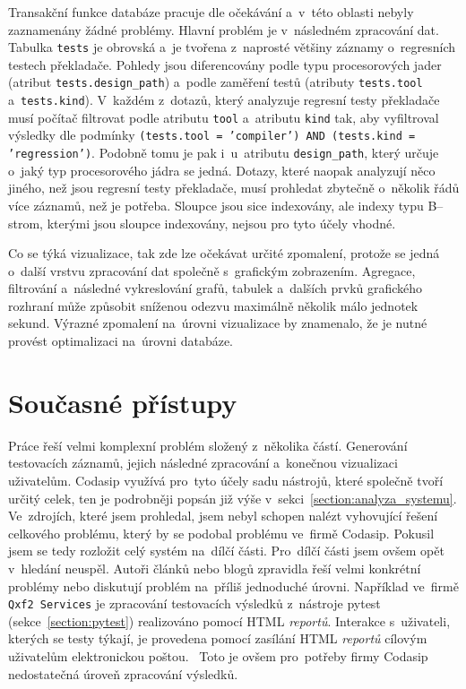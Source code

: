 Transakční funkce databáze pracuje dle očekávání a~v~této oblasti nebyly zaznamenány žádné problémy. Hlavní problém
je v~následném zpracování dat. Tabulka \texttt{tests} je obrovská a~je tvořena z~naprosté většiny záznamy
o~regresních testech překladače. Pohledy jsou diferencovány podle typu procesorových jader (atribut
\texttt{tests.design\_path}) a~podle zaměření testů (atributy \texttt{tests.tool} a~\texttt{tests.kind}). V~každém
z~dotazů, který analyzuje regresní testy překladače musí počítač filtrovat podle atributu \texttt{tool} a~atributu
\texttt{kind} tak, aby vyfiltroval výsledky dle podmínky \texttt{(tests.tool = 'compiler') AND (tests.kind = 'regression')}. Podobně tomu je pak i~u~atributu \texttt{design\_path}, který určuje o~jaký typ procesorového jádra
se jedná. Dotazy, které naopak analyzují něco jiného, než jsou regresní testy překladače, musí prohledat zbytečně
o~několik řádů více záznamů, než je potřeba. Sloupce jsou sice indexovány, ale indexy typu B--strom, kterými jsou sloupce indexovány, nejsou pro tyto účely vhodné.

Co se týká vizualizace, tak zde lze očekávat určité zpomalení, protože se jedná o~další vrstvu zpracování dat
společně s~grafickým zobrazením. Agregace, filtrování a~následné vykreslování grafů, tabulek a~dalších prvků
grafického rozhraní může způsobit sníženou odezvu maximálně několik málo jednotek sekund. Výrazné zpomalení na~úrovni
vizualizace by znamenalo, že je nutné provést optimalizaci na~úrovni databáze.

\section{Současné přístupy}
\label{section:soucasne_pristupy}
Práce řeší velmi komplexní problém složený z~několika částí. Generování testovacích záznamů, jejich následné
zpracování a~konečnou vizualizaci uživatelům. Codasip využívá pro~tyto účely sadu nástrojů, které společně tvoří
určitý celek, ten je podrobněji popsán již výše v~sekci~\ref{section:analyza_systemu}.
Ve~zdrojích, které jsem prohledal, jsem nebyl schopen nalézt vyhovující řešení celkového problému, který by se
podobal problému ve~firmě Codasip. Pokusil jsem se tedy rozložit celý systém na~dílčí části. Pro~dílčí části jsem
ovšem opět v~hledání neuspěl. Autoři článků nebo blogů zpravidla řeší velmi konkrétní problémy nebo diskutují problém
na~příliš jednoduché úrovni. Například ve~firmě \texttt{Qxf2 Services} je zpracování testovacích výsledků z~nástroje
pytest (sekce~\ref{section:pytest}) realizováno pomocí HTML \textit{reportů}. Interakce s~uživateli, kterých se testy týkají, je provedena pomocí zasílání HTML \textit{reportů} cílovým uživatelům elektronickou poštou.~\cite{PytestEmailReporting} Toto je ovšem pro~potřeby firmy Codasip nedostatečná úroveň zpracování výsledků.


